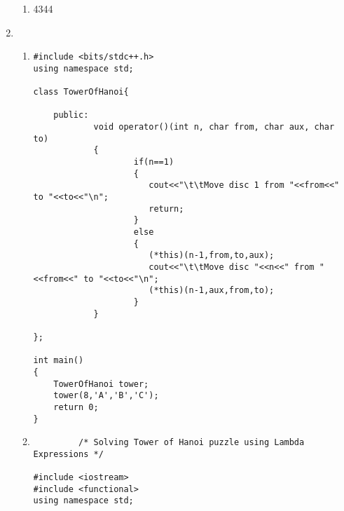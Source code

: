 \documentclass[11pt]{article}
\begin{document}
\begin{enumerate}
\begin{enumerate}
\item 4344
\end{enumerate}
\item
\begin{enumerate}
     \item \begin{lstlisting}
#include <bits/stdc++.h>
using namespace std;

class TowerOfHanoi{

    public:
            void operator()(int n, char from, char aux, char to)
            {
                    if(n==1)
                    {
                       cout<<"\t\tMove disc 1 from "<<from<<" to "<<to<<"\n";
                       return;
                    }
                    else
                    {
                       (*this)(n-1,from,to,aux);
                       cout<<"\t\tMove disc "<<n<<" from "<<from<<" to "<<to<<"\n";
                       (*this)(n-1,aux,from,to);
                    }
            }
        
};

int main()
{
    TowerOfHanoi tower;
    tower(8,'A','B','C');
    return 0;
}
     \end{lstlisting}

\item \begin{lstlisting}
         /* Solving Tower of Hanoi puzzle using Lambda Expressions */

#include <iostream>
#include <functional>
using namespace std;


\end{lstlisting}
\end{enumerate}
\end{enumerate}
\end{document}
